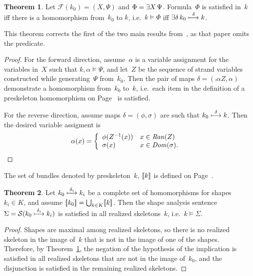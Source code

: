 \documentclass[12pt]{report}
\theoremstyle{definition}
\newtheorem{thm}{Theorem}[chapter]
\newcommand{\sdom}{\fn{Dom}}
\newcommand{\sran}{\fn{Ran}}
\newcommand{\form}{\mathcal{F}}
\newcommand{\sent}{\mathcal{S}}
\begin{document}
\begin{thm}\label{thm:skeleton models}
Let $\form(k_0)=(X,\Psi)$ and $\Phi=\mathop{\exists X}\Psi$.  Formula~$\Phi$ is
satisfied in~$k$ iff there is a homomorphism from~$k_0$ to
$k$, i.e.\ $k\models\Phi$ iff
$\mathop{\exists\delta}k_0\stackrel{\delta}{\longmapsto}k$.
\end{thm}

This theorem corrects the first of the two main results
from~\cite{guttman09}, as that paper omits the  predicate.

\begin{proof}
For the forward direction, assume~$\alpha$ is a variable assignment
for the variables in~$X$ such that $k,\alpha\models\Psi$, and let~$Z$
be the sequence of strand variables constructed while
generating~$\Psi$ from~$k_0$.  Then the pair of maps
$\delta=(\comp{\alpha}{Z},\alpha)$ demonstrate a homomorphism from~$k_0$
to~$k$, i.e.\ each item in the definition of a preskeleton
homomorphism on Page~\pageref{def:preskeleton homomorphism} is
satisfied.

For the reverse direction, assume maps $\delta=(\phi,\sigma)$ are such
that $k_0\stackrel{\delta}{\longmapsto}k$.  Then the desired variable assigment is
$$\alpha(x)=\left\{
\begin{array}{ll}
\phi(Z^{-1}(x))&x\in\sran(Z)\\
\sigma(x)&x\in\sdom(\sigma).
\end{array}\right.$$
\end{proof}

The set of bundles denoted by preskeleton~$k$, $[\![k]\!]$ is
defined on Page~\pageref{def:preskeleton denotation}.

\begin{thm}\label{thm:sentence implies}
Let $k_0\stackrel{\delta_i}{\longmapsto}k_i$ be a complete set of homomorphisms
for shapes $k_i\in K$, and assume $[\![k_0]\!]=\bigcup_{k\in
  K}[\![k]\!]$.  Then the shape analysis
sentence~$\Sigma=\sent(k_0\homomorphism{\delta_i}k_i)$ is satisfied in
all realized skeletons~$k$, i.e.\ $k\models\Sigma$.
\end{thm}

\begin{proof}
Shapes are maximal among realized skeletons, so there is no realized
skeleton in the image of~$k$ that is not in the image of one of the
shapes.  Therefore, by Theorem~\ref{thm:skeleton models}, the negation
of the hypothesis of the implication is satisfied in all realized
skeletons that are not in the image of~$k_0$, and the disjunction is
satisfied in the remaining realized skeletons.
\end{proof}
\end{document}

